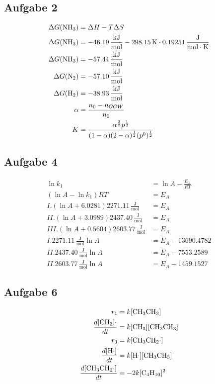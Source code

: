 \documentclass{article}
\begin{document}
\subsection*{Aufgabe 2}
\begin{align*}
    \Delta G(\ce{NH3}) &= \Delta H - T \Delta S\\
    \Delta G(\ce{NH3}) &= -46.19\,\mathrm{\frac{kJ}{mol}} - 298.15\,\mathrm{K}\cdot 0.19251\,\mathrm{\frac{J}{mol\cdot K}}\\
    \Delta G(\ce{NH3}) &= -57.44\,\mathrm{\frac{kJ}{mol}}\\
    \Delta G(\ce{N2}) &= -57.10\,\mathrm{\frac{kJ}{mol}}\\
    \Delta G(\ce{H2}) &= -38.93\,\mathrm{\frac{kJ}{mol}}\\
    \alpha &= \frac{n_0 - n_{GGW}}{n_0}\\
    K &= \frac{\alpha^{\frac{3}{2}}p^{\frac{1}{2}}}{(1-\alpha)(2-\alpha)^\frac{1}{2} (p^0)^\frac{1}{2}}
\end{align*}

\subsection*{Aufgabe 4}
\begin{align*}
    \ln k_1 &= \ln A -\frac{E_{A}}{RT}\\
    (\ln A - \ln k_1) RT &= E_{A}\\
    I. (\ln A + 6.0281) 2271.11\,\mathrm{\frac{J}{mol}} &= E_{A}\\
    II. (\ln A + 3.0989) 2437.40\,\mathrm{\frac{J}{mol}} &= E_{A}\\
    III. (\ln A + 0.5604) 2603.77\,\mathrm{\frac{J}{mol}} &= E_{A}\\
    I. 2271.11\,\mathrm{\frac{J}{mol}}\ln A &= E_A - 13690.4782 \\
    II. 2437.40\,\mathrm{\frac{J}{mol}}\ln A &= E_A - 7553.2589\\
    II. 2603.77\,\mathrm{\frac{J}{mol}}\ln A &= E_A -  1459.1527
\end{align*}

\subsection*{Aufgabe 6}
\begin{align*}
    r_1 &= k[\ce{CH3CH3}]\\
    \frac{d[\ce{CH3}]\cdot}{dt} &= k[\ce{CH3}][\ce{CH3CH3}]\\
    r_3 &= k[\ce{CH3CH2}\cdot]\\
    \frac{d[\ce{H}\cdot]}{dt} &= k[\ce{H}\cdot][\ce{CH3CH3}]\\
    \frac{d[\ce{CH3CH2}\cdot]}{dt} &= -2k[\ce{C4H10}]^2
\end{align*}
\end{document}
